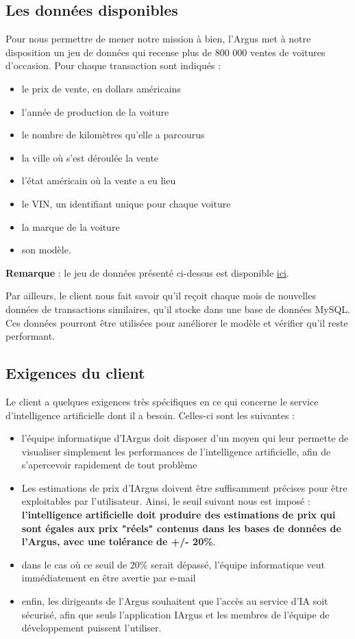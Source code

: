 \documentclass[french]{article}
\begin{document}
    \subsection{Les données disponibles}
    Pour nous permettre de mener notre mission à bien, l'Argus met à notre disposition un jeu de données qui recense plus de 800 000 ventes de voitures d'occasion. Pour chaque transaction sont indiqués :
    \begin{itemize}
        \item le prix de vente, en dollars américains
        \item l'année de production de la voiture
        \item le nombre de kilomètres qu'elle a parcourus
        \item la ville où s'est déroulée la vente
        \item l'état américain où la vente a eu lieu
        \item le VIN, un identifiant unique pour chaque voiture
        \item la marque de la voiture
        \item son modèle.
    \end{itemize}
    \textbf{Remarque} : le jeu de données présenté ci-dessus est disponible \href{https://www.kaggle.com/datasets/harikrishnareddyb/used-car-price-predictions/data}{ici}.
    
    Par ailleurs, le client nous fait savoir qu'il reçoit chaque mois de nouvelles données de transactions similaires, qu'il stocke dans une base de données MySQL. Ces données pourront être utilisées pour améliorer le modèle et vérifier qu'il reste performant.
    \subsection{Exigences du client}
    Le client a quelques exigences très spécifiques en ce qui concerne le service d'intelligence artificielle dont il a besoin. Celles-ci sont les suivantes :
    \begin{itemize}
        \item l'équipe informatique d'IArgus doit disposer d'un moyen qui leur permette de visualiser simplement les performances de l'intelligence artificielle, afin de s'apercevoir rapidement de tout problème
        \item Les estimations de prix d'IArgus doivent être suffisamment précises pour être exploitables par l'utilisateur. Ainsi, le seuil suivant nous est imposé : \textbf{l'intelligence artificielle doit produire des estimations de prix qui sont égales aux prix "réels" contenus dans les bases de données de l'Argus, avec une tolérance de +/- 20\%}. 
        \item dans le cas où ce seuil de 20\% serait dépassé, l'équipe informatique veut immédiatement en être avertie par e-mail
        \item enfin, les dirigeants de l'Argus souhaitent que l'accès au service d'IA soit sécurisé, afin que seuls l'application IArgus et les membres de l'équipe de développement puissent l'utiliser.
    \end{itemize}
\end{document}

